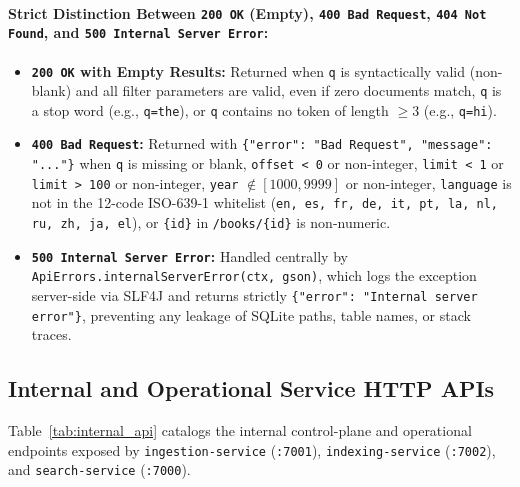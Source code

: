 \documentclass[10pt,a4paper]{article}
\begin{document}
\paragraph{Strict Distinction Between \texttt{200 OK} (Empty), \texttt{400 Bad Request}, \texttt{404 Not Found}, and \texttt{500 Internal Server Error}:}
\begin{itemize}[leftmargin=*,nosep]
    \item \textbf{\texttt{200 OK} with Empty Results:} Returned when \texttt{q} is syntactically valid (non-blank) and all filter parameters are valid, even if zero documents match, \texttt{q} is a stop word (e.g., \texttt{q=the}), or \texttt{q} contains no token of length $\ge 3$ (e.g., \texttt{q=hi}).
    \item \textbf{\texttt{400 Bad Request}:} Returned with \texttt{\{"error": "Bad Request", "message": "..."\}} when \texttt{q} is missing or blank, \texttt{offset < 0} or non-integer, \texttt{limit < 1} or \texttt{limit > 100} or non-integer, \texttt{year} $\notin [1000, 9999]$ or non-integer, \texttt{language} is not in the 12-code ISO-639-1 whitelist (\texttt{en, es, fr, de, it, pt, la, nl, ru, zh, ja, el}), or \texttt{\{id\}} in \texttt{/books/\{id\}} is non-numeric.
    \item \textbf{\texttt{500 Internal Server Error}:} Handled centrally by \texttt{ApiErrors.internalServerError(ctx, gson)}, which logs the exception server-side via SLF4J and returns strictly \texttt{\{"error": "Internal server error"\}}, preventing any leakage of SQLite paths, table names, or stack traces.
\end{itemize}

\subsection{Internal and Operational Service HTTP APIs}
Table~\ref{tab:internal_api} catalogs the internal control-plane and operational endpoints exposed by \texttt{ingestion-service} (\texttt{:7001}), \texttt{indexing-service} (\texttt{:7002}), and \texttt{search-service} (\texttt{:7000}).
\end{document}
